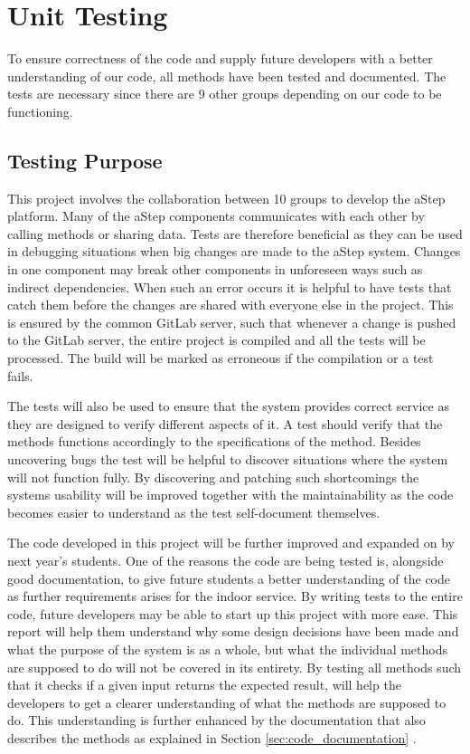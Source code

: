 \section{Unit Testing}\label{sec:unit_test}
To ensure correctness of the code and supply future developers with a better understanding of our code, all methods have been tested and documented. 
The tests are necessary since there are 9 other groups depending on our code to be functioning.

\subsection{Testing Purpose}
This project involves the collaboration between 10 groups to develop the aStep platform. 
Many of the aStep components communicates with each other by calling methods or sharing data.
Tests are therefore beneficial as they can be used in debugging situations when big changes are made to the aStep system. 
Changes in one component may break other components in unforeseen ways such as indirect dependencies.
When such an error occurs it is helpful to have tests that catch them before the changes are shared with everyone else in the project. This is ensured by the common GitLab server, such that whenever a change is pushed to the GitLab server, the entire project is compiled and all the tests will be processed. The build will be marked as erroneous if the compilation or a test fails.

The tests will also be used to ensure that the system provides correct service as they are designed to verify different aspects of it.
A test should verify that the methods functions accordingly to the specifications of the method.
Besides uncovering bugs the test will be helpful to discover situations where the system will not function fully.
By discovering and patching such shortcomings the systems usability will be improved together with the maintainability as the code becomes easier to understand as the test self-document themselves. 

The code developed in this project will be further improved and expanded on by next year's students. One of the reasons the code are being tested is, alongside good documentation, to give future students a better understanding of the code as further requirements arises for the indoor service. 
By writing tests to the entire code, future developers may be able to start up this project with more ease. 
This report will help them understand why some design decisions have been made and what the purpose of the system is as a whole, but what the individual methods are supposed to do will not be covered in its entirety. 
By testing all methods such that it checks if a given input returns the expected result, will help the developers to get a clearer understanding of what the methods are supposed to do. 
This understanding is further enhanced by the documentation that also describes the methods as explained in Section \ref{sec:code_documentation} . 

